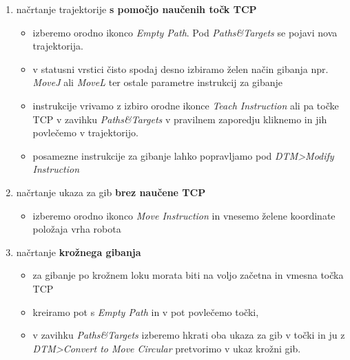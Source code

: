\begin{enumerate}

\item \vspace*{0.2cm} načrtanje trajektorije \textbf{s pomočjo
naučenih točk TCP}
\begin{itemize}
    \item izberemo orodno ikonco \emph{Empty Path}. Pod \emph{Paths\&Targets} se pojavi nova trajektorija.
    \item v statusni vrstici čisto spodaj desno izbiramo želen način gibanja npr. \emph{MoveJ} ali
    \emph{MoveL} ter ostale parametre instrukcij za gibanje
    \item instrukcije vrivamo z izbiro orodne ikonce \emph{Teach Instruction} ali pa točke TCP v zavihku \emph{Paths\&Targets} v pravilnem zaporedju kliknemo in jih povlečemo v trajektorijo.
    \item posamezne instrukcije za gibanje lahko popravljamo pod \emph{DTM>Modify Instruction}
\end{itemize}
\item \vspace*{0.2cm} načrtanje ukaza za gib \textbf{brez naučene
TCP}
    \begin{itemize}
    \item izberemo orodno ikonco \emph{Move Instruction} in vnesemo želene
koordinate položaja vrha robota
    \end{itemize}

\item \vspace*{0.2cm} načrtanje \textbf{krožnega gibanja}
\begin{itemize}
\item  za gibanje po krožnem loku morata biti na voljo začetna in
vmesna točka TCP \item kreiramo pot s \emph{Empty Path} in v pot
povlečemo točki, \item v zavihku \emph{Paths\&Targets} izberemo
hkrati oba ukaza za gib v točki in ju z \emph{DTM>Convert to Move
Circular} pretvorimo v ukaz krožni gib.
\end{itemize}


\end{enumerate}
